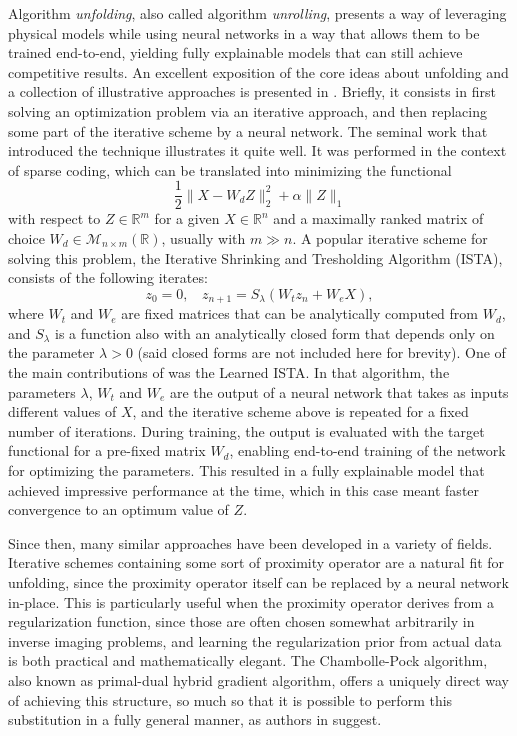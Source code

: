 \documentclass[twocolumn,twoside,a4paper,10pt]{IEEEtran}
\begin{document}
Algorithm \textit{unfolding}, also called algorithm \textit{unrolling}, presents a way of leveraging physical models while
using neural networks in a way that allows them to be trained end-to-end,
yielding fully explainable models that can still achieve competitive results.
An excellent exposition of the core ideas about unfolding and a collection of
illustrative approaches is presented in \cite{9363511}. Briefly, it consists in
first solving an optimization problem via an iterative approach,
and then replacing some part of the iterative scheme by a neural network. The seminal work that introduced the technique \cite{10.5555/3104322.3104374} illustrates it quite well. It was performed in the context of sparse coding, which can be translated into minimizing the functional
\[
  \frac12\|X-W_dZ\|_2^2 + \alpha \|Z\|_{1}
\]
with respect to \(Z\in \mathbb{R}^m\) for a given \(X\in \mathbb{R}^n\) and a maximally ranked matrix of choice \(W_d\in \mathcal{M}_{n\times m}(\mathbb{R})\), usually with \(m\gg n\). A popular
iterative scheme for solving this problem, the Iterative Shrinking and Tresholding Algorithm (ISTA), consists of the following iterates:
\[
 z_0 = 0, ~~~~ z_{n+1} = S_\lambda\left(W_tz_n+W_eX\right)
,\]
where \(W_t\) and \(W_e\) are fixed matrices that can be analytically computed
from \(W_d\), and \(S_\lambda\) is a function also with an analytically closed
form that depends only on the parameter \(\lambda>0\) (said closed forms are not included here for brevity). One of the main contributions of \cite{10.5555/3104322.3104374} was the Learned ISTA. In that algorithm, the parameters \(\lambda\), \(W_t\) and \(W_e\) are the output of a neural network that takes as inputs different values of \(X\), and the
iterative scheme above is repeated for a fixed number of iterations. During training,
the output is evaluated with the target functional for a pre-fixed matrix \(W_d\), enabling end-to-end training
of the network for optimizing the parameters. This resulted in a fully
explainable model that achieved impressive performance at the time, which in
this case meant faster convergence to an optimum value of \(Z\).

Since then, many similar approaches have been developed in a variety of fields.
Iterative schemes containing some sort of proximity operator are a natural
fit for unfolding, since the proximity operator itself can be replaced by a neural
network in-place. This is particularly useful when the proximity operator
derives from a regularization function, since those are often chosen somewhat
arbitrarily in inverse imaging problems, and learning the regularization prior
from actual data is both practical and mathematically elegant. The Chambolle-Pock algorithm, also known as primal-dual hybrid gradient algorithm, offers a uniquely
direct way of achieving this structure, so much so that it is possible to
perform this substitution in a fully general manner, as authors in \cite{8271999} suggest.
\end{document}
